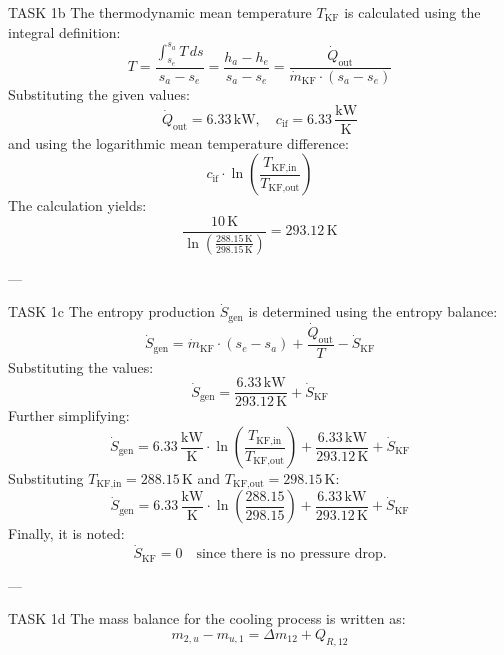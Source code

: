 TASK 1b  
The thermodynamic mean temperature \( T_{\text{KF}} \) is calculated using the integral definition:  
\[
T = \frac{\int_{s_e}^{s_a} T \, ds}{s_a - s_e} = \frac{h_a - h_e}{s_a - s_e} = \frac{\dot{Q}_{\text{out}}}{\dot{m}_{\text{KF}} \cdot (s_a - s_e)}
\]  
Substituting the given values:  
\[
\dot{Q}_{\text{out}} = 6.33 \, \text{kW}, \quad c_{\text{if}} = 6.33 \, \frac{\text{kW}}{\text{K}}
\]  
and using the logarithmic mean temperature difference:  
\[
c_{\text{if}} \cdot \ln \left( \frac{T_{\text{KF,in}}}{T_{\text{KF,out}}} \right)
\]  
The calculation yields:  
\[
\frac{10 \, \text{K}}{\ln \left( \frac{288.15 \, \text{K}}{298.15 \, \text{K}} \right)} = 293.12 \, \text{K}
\]  

---

TASK 1c  
The entropy production \( \dot{S}_{\text{gen}} \) is determined using the entropy balance:  
\[
\dot{S}_{\text{gen}} = \dot{m}_{\text{KF}} \cdot (s_e - s_a) + \frac{\dot{Q}_{\text{out}}}{T} - \dot{S}_{\text{KF}}
\]  
Substituting the values:  
\[
\dot{S}_{\text{gen}} = \frac{6.33 \, \text{kW}}{293.12 \, \text{K}} + \dot{S}_{\text{KF}}
\]  
Further simplifying:  
\[
\dot{S}_{\text{gen}} = 6.33 \, \frac{\text{kW}}{\text{K}} \cdot \ln \left( \frac{T_{\text{KF,in}}}{T_{\text{KF,out}}} \right) + \frac{6.33 \, \text{kW}}{293.12 \, \text{K}} + \dot{S}_{\text{KF}}
\]  
Substituting \( T_{\text{KF,in}} = 288.15 \, \text{K} \) and \( T_{\text{KF,out}} = 298.15 \, \text{K} \):  
\[
\dot{S}_{\text{gen}} = 6.33 \, \frac{\text{kW}}{\text{K}} \cdot \ln \left( \frac{288.15}{298.15} \right) + \frac{6.33 \, \text{kW}}{293.12 \, \text{K}} + \dot{S}_{\text{KF}}
\]  
Finally, it is noted:  
\[
\dot{S}_{\text{KF}} = 0 \quad \text{since there is no pressure drop.}
\]  

---

TASK 1d  
The mass balance for the cooling process is written as:  
\[
m_{2,u} - m_{u,1} = \Delta m_{12} + Q_{R,12}
\]  